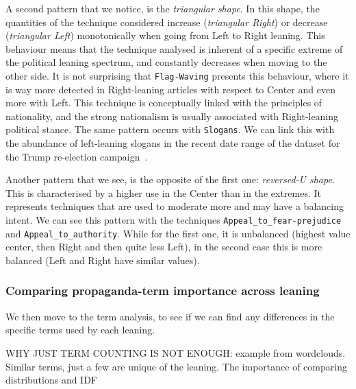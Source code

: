 A second pattern that we notice, is the \emph{triangular shape}. In this shape, the quantities of the technique considered increase (\emph{triangular Right}) or decrease (\emph{triangular Left}) monotonically when going from Left to Right leaning.
This behaviour means that the technique analysed is inherent of a specific extreme of the political leaning spectrum, and constantly decreases when moving to the other side.
It is not surprising that \texttt{Flag-Waving} presents this behaviour, where it is way more detected in Right-leaning articles with respect to Center and even more with Left. This technique is conceptually linked with the principles of nationality, and the strong nationalism is usually associated with Right-leaning political stance.
The same pattern occurs with \texttt{Slogans}. We can link this with the abundance of left-leaning slogans in the recent date range of the dataset for the Trump re-election campaign~\citep{jiang2020political}.

Another pattern that we see, is the opposite of the first one: \emph{reversed-U shape}. This is characterised by a higher use in the Center than in the extremes.
It represents techniques that are used to moderate more and may have a balancing intent.
We can see this pattern with the techniques \texttt{Appeal\_to\_fear-prejudice} and \texttt{Appeal\_to\_authority}. While for the first one, it is unbalanced (highest value center, then Right and then quite less Left), in the second case this is more balanced (Left and Right have similar values).

\subsubsection{Comparing propaganda-term importance across leaning}
We then move to the term analysis, to see if we can find any differences in the specific terms used by each leaning.

WHY JUST TERM COUNTING IS NOT ENOUGH: example from wordclouds. Similar terms, just a few are unique of the leaning. The importance of comparing distributions and IDF


